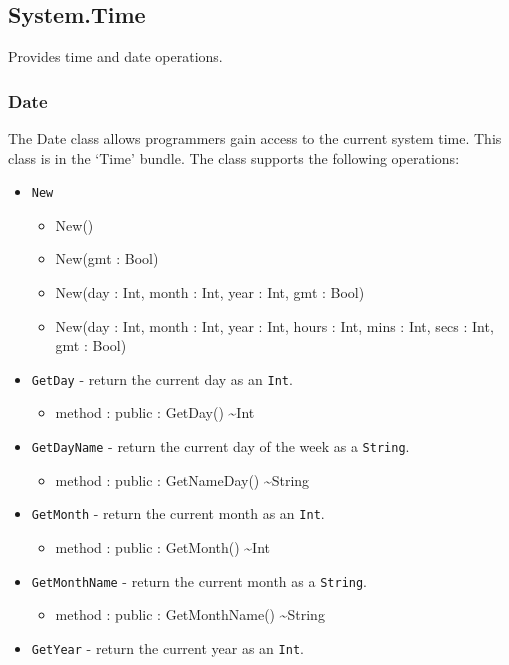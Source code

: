 \documentclass[11pt]{article}
\begin{document}
\subsection{System.Time}
Provides time and date operations.

\subsubsection{Date}
The Date class allows programmers gain access to the current system
time.  This class is in the `Time' bundle.  The class supports the
following operations:
\begin{itemize}
\item \texttt{New}
  \begin{itemize}
  \item New()
  \item New(gmt : Bool)
  \item New(day : Int, month : Int, year : Int, gmt : Bool)
  \item New(day : Int, month : Int, year : Int, hours : Int, mins :
    Int, secs : Int, gmt : Bool)
  \end{itemize}
\item \texttt{GetDay} - return the current day as an \texttt{Int}.
  \begin{itemize}
  \item method : public : GetDay() \textasciitilde Int
  \end{itemize}
\item \texttt{GetDayName} - return the current day of the week as a
  \texttt{String}.
  \begin{itemize}
  \item method : public : GetNameDay() \textasciitilde String
  \end{itemize}
\item \texttt{GetMonth} - return the current month as an \texttt{Int}.
  \begin{itemize}
  \item method : public : GetMonth() \textasciitilde Int
  \end{itemize}
\item \texttt{GetMonthName} - return the current month as a
  \texttt{String}.
  \begin{itemize}
  \item method : public : GetMonthName() \textasciitilde String
  \end{itemize}
\item \texttt{GetYear} - return the current year as an \texttt{Int}.

\end{itemize}
\end{document}
